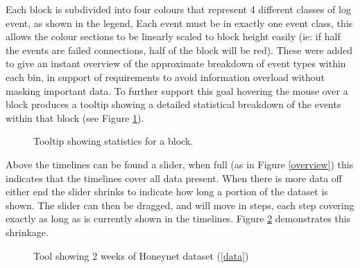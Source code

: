 Each block is subdivided into four colours that represent 4 different classes of log event, as shown in the legend, Each event must be in exactly one event class, this allows the colour sections to be linearly scaled to block height easily (ie: if half the events are failed connections, half of the block will be red). These were added to give an instant overview of the approximate breakdown of event types within each bin, in support of requirements to avoid information overload without masking important data. To further support this goal hovering the mouse over a block produces a tooltip showing a detailed statistical breakdown of the events within that block (see Figure \ref{des_tooltip}). 

\begin{figure}[tbh]
\caption{\protect\label{des_tooltip}Tooltip showing statistics for a block.}
\end{figure}

Above the timelines can be found a slider, when full (as in Figure \ref{overview}) this indicates that the timelines cover all data present. When there is more data off either end the slider shrinks to indicate how long a portion of the dataset is shown. The slider can then be dragged, and will move in steps, each step covering exactly as long as is currently shown in the timelines. Figure \ref{zoomed_in} demonstrates this shrinkage. 

\begin{figure}[tbh!]
\caption{\protect\label{zoomed_in}Tool showing 2 weeks of Honeynet dataset (\ref{data})}
\end{figure}

